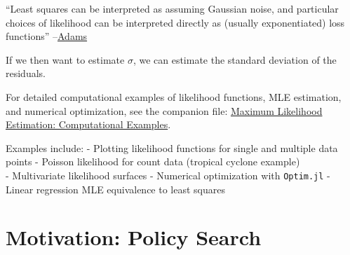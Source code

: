 \documentclass[
  letterpaper,
  DIV=11,
  numbers=noendperiod]{scrreprt}
\begin{document}
\begin{tcolorbox}[enhanced jigsaw, arc=.35mm, breakable, title=\textcolor{quarto-callout-important-color}{\faExclamation}\hspace{0.5em}{Key point}, coltitle=black, opacityback=0, bottomtitle=1mm, colback=white, left=2mm, opacitybacktitle=0.6, toptitle=1mm, colframe=quarto-callout-important-color-frame, leftrule=.75mm, titlerule=0mm, rightrule=.15mm, bottomrule=.15mm, colbacktitle=quarto-callout-important-color!10!white, toprule=.15mm]

``Least squares can be interpreted as assuming Gaussian noise, and
particular choices of likelihood can be interpreted directly as (usually
exponentiated) loss functions''
--\href{https://www.cs.princeton.edu/courses/archive/fall18/cos324/files/mle-regression.pdf}{Adams}

\end{tcolorbox}

If we then want to estimate \(\sigma\), we can estimate the standard
deviation of the residuals.

\begin{tcolorbox}[enhanced jigsaw, arc=.35mm, breakable, title=\textcolor{quarto-callout-tip-color}{\faLightbulb}\hspace{0.5em}{Computational examples}, coltitle=black, opacityback=0, bottomtitle=1mm, colback=white, left=2mm, opacitybacktitle=0.6, toptitle=1mm, colframe=quarto-callout-tip-color-frame, leftrule=.75mm, titlerule=0mm, rightrule=.15mm, bottomrule=.15mm, colbacktitle=quarto-callout-tip-color!10!white, toprule=.15mm]

For detailed computational examples of likelihood functions, MLE
estimation, and numerical optimization, see the companion file:
\href{./chapters/fundamentals/optimization-examples.qmd}{Maximum
Likelihood Estimation: Computational Examples}.

Examples include: - Plotting likelihood functions for single and
multiple data points - Poisson likelihood for count data (tropical
cyclone example)\\
- Multivariate likelihood surfaces - Numerical optimization with
\texttt{Optim.jl} - Linear regression MLE equivalence to least squares

\end{tcolorbox}

\section{Motivation: Policy Search}\label{motivation-policy-search}
\end{document}
